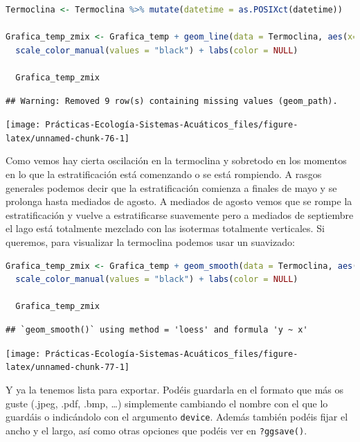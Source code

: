 \documentclass[
]{book}
\newcommand{\passthrough}[1]{#1}
\begin{document}
\begin{lstlisting}[language=R]
Termoclina <- Termoclina %>% mutate(datetime = as.POSIXct(datetime))

Grafica_temp_zmix <- Grafica_temp + geom_line(data = Termoclina, aes(x=datetime, y = thermo.depth, color = "Termoclina"), size = 0.2)+
  scale_color_manual(values = "black") + labs(color = NULL)
  
  Grafica_temp_zmix
\end{lstlisting}

\begin{lstlisting}
## Warning: Removed 9 row(s) containing missing values (geom_path).
\end{lstlisting}

\texttt{[image: Prácticas-Ecología-Sistemas-Acuáticos\_files/figure-latex/unnamed-chunk-76-1]}

Como vemos hay cierta oscilación en la termoclina y sobretodo en los momentos en lo que la estratificación está comenzando o se está rompiendo. A rasgos generales podemos decir que la estratificación comienza a finales de mayo y se prolonga hasta mediados de agosto. A mediados de agosto vemos que se rompe la estratificación y vuelve a estratificarse suavemente pero a mediados de septiembre el lago está totalmente mezclado con las isotermas totalmente verticales. Si queremos, para visualizar la termoclina podemos usar un suavizado:

\begin{lstlisting}[language=R]
Grafica_temp_zmix <- Grafica_temp + geom_smooth(data = Termoclina, aes(x=datetime, y = thermo.depth, color = "Termoclina"), size = 0.2, na.rm = TRUE, se = FALSE)+
  scale_color_manual(values = "black") + labs(color = NULL)
  
  Grafica_temp_zmix
\end{lstlisting}

\begin{lstlisting}
## `geom_smooth()` using method = 'loess' and formula 'y ~ x'
\end{lstlisting}

\texttt{[image: Prácticas-Ecología-Sistemas-Acuáticos\_files/figure-latex/unnamed-chunk-77-1]}

Y ya la tenemos lista para exportar. Podéis guardarla en el formato que más os guste (.jpeg, .pdf, .bmp, \ldots) simplemente cambiando el nombre con el que lo guardáis o indicándolo con el argumento \passthrough{\lstinline!device!}. Además también podéis fijar el ancho y el largo, así como otras opciones que podéis ver en \passthrough{\lstinline!?ggsave()!}.
\end{document}
